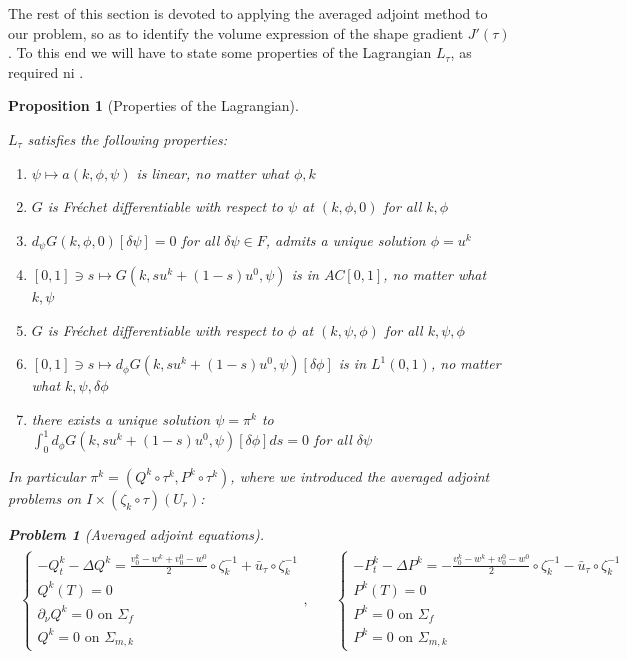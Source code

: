 \documentclass[english,a4paper,9pt,oneside]{scrbook}	%
\theoremstyle{break}
\newtheorem{prop}[equation]{Proposition}
\newtheorem{pb}[equation]{Problem}
\theoremstyle{remark}
\newcommand{\ds}{\displaystyle}
\begin{document}
The rest of this section is devoted to applying the averaged adjoint method \cite{avg_adj} to our problem, so as to identify the volume expression of the shape gradient $J'(\tau)$. To this end we will have to state some properties of the Lagrangian $L_\tau $, as required ni \cite{avg_adj}.

\begin{prop}[Properties of the Lagrangian]
\label{prop:lagr}

$L_\tau$ satisfies the following properties:

\begin{enumerate}
	\item $\psi \mapsto a(k, \phi,\psi)$ is linear, no matter what $\phi,k$
	\item $G$ is Fréchet differentiable with respect to $\psi$ at $(k,\phi,0)$ for all $k, \phi$
	\item $d_\psi G(k,\phi,0)[\delta \psi]=0$ for all $\delta \psi \in F$, admits a unique solution $\phi = u^k$
	\item $[0,1]\ni s \mapsto G(k, su^k + (1-s)u^0,\psi)$ is in $AC[0,1]$, no matter what $k, \psi$
	\item $G$ is Fréchet differentiable with respect to $\phi$ at $(k,\psi,\phi)$ for all $k, \psi, \phi$
	\item $[0,1]\ni s \mapsto d_\phi G(k, su^k + (1-s)u^0,\psi)[\delta \phi]$ is in $L^1(0,1)$, no matter what $k, \psi, \delta \phi$
	\item there exists a unique solution $\psi = \pi^k$ to $\ds \int_0^1 d_\phi G(k, su^k + (1-s)u^0,\psi)[\delta \phi]ds =0$ for all $\delta \psi$ 
\end{enumerate}

In particular $\pi^k = (Q^k \circ \tau^k,P^k \circ \tau^k)$, where we introduced the averaged adjoint problems on $I\times (\zeta_k\circ \tau )(U_r)$:

\begin{pb}[Averaged adjoint equations]
\label{pb:avg_adj_pb}
\begin{align*}
\begin{matrix}
\left\{\begin{matrix}
-Q^k_t-\Delta Q^k =\frac{v_0^k-w^k+v_0^0-w^0}{2}\circ \zeta_k^{-1}+\bar{u}_\tau\circ \zeta_k^{-1}\\
Q^k(T)=0\\
\partial_\nu Q^k = 0 \text{ on } \Sigma_f\\
Q^k = 0 \text{ on } \Sigma_{m,k}
\end{matrix}\right.
, \quad &
\left\{\begin{matrix}
-P^k_t-\Delta P^k =-\frac{v_0^k-w^k+v_0^0-w^0}{2}\circ \zeta_k^{-1}-\bar{u}_\tau\circ \zeta_k^{-1}\\
P^k(T)=0\\
P^k = 0 \text{ on } \Sigma_f\\
P^k = 0 \text{ on } \Sigma_{m,k}
\end{matrix}\right.
\end{matrix}
\end{align*}
\end{pb}

\end{prop}
\end{document}
